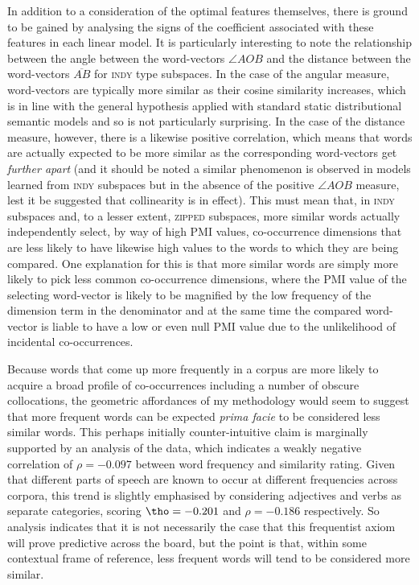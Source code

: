 In addition to a consideration of the optimal features themselves, there is ground to be gained by analysing the signs of the coefficient associated with these features in each linear model.  It is particularly interesting to note the relationship between the angle between the word-vectors $\angle AOB$ and the distance between the word-vectors $\overline{AB}$ for \textsc{indy} type subspaces.  In the case of the angular measure, word-vectors are typically more similar as their cosine similarity increases, which is in line with the general hypothesis applied with standard static distributional semantic models and so is not particularly surprising.  In the case of the distance measure, however, there is a likewise positive correlation, which means that words are actually expected to be more similar as the corresponding word-vectors get \emph{further apart} (and it should be noted a similar phenomenon is observed in models learned from \textsc{indy} subspaces but in the absence of the positive $\angle AOB$ measure, lest it be suggested that collinearity is in effect).  This must mean that, in \textsc{indy} subspaces and, to a lesser extent, \textsc{zipped} subspaces, more similar words actually independently select, by way of high PMI values, co-occurrence dimensions that are less likely to have likewise high values to the words to which they are being compared.  One explanation for this is that more similar words are simply more likely to pick less common co-occurrence dimensions, where the PMI value of the selecting word-vector is likely to be magnified by the low frequency of the dimension term in the denominator and at the same time the compared word-vector is liable to have a low or even null PMI value due to the unlikelihood of incidental co-occurrences.

Because words that come up more frequently in a corpus are more likely to acquire a broad profile of co-occurrences including a number of obscure collocations, the geometric affordances of my methodology would seem to suggest that more frequent words can be expected \emph{prima facie} to be considered less similar words.  This perhaps initially counter-intuitive claim is marginally supported by an analysis of the data, which indicates a weakly negative correlation of $\rho = -0.097$ between word frequency and similarity rating.  Given that different parts of speech are known to occur at different frequencies across corpora, this trend is slightly emphasised by considering adjectives and verbs as separate categories, scoring $\tho = -0.201$ and $\rho = -0.186$ respectively.  So analysis indicates that it is not necessarily the case that this frequentist axiom will prove predictive across the board, but the point is that, within some contextual frame of reference, less frequent words will tend to be considered more similar.

